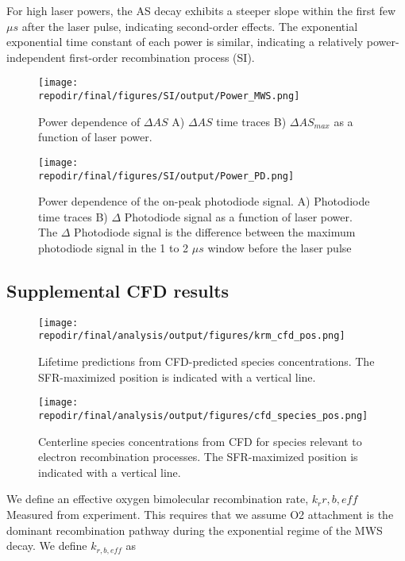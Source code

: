For high laser powers, the AS decay exhibits a steeper slope within the first few $\mu s$ after the laser pulse, indicating second-order effects. The exponential exponential time constant of each power is similar, indicating a relatively power-independent first-order recombination process (SI).

\begin{figure}[h]
    \texttt{[image: \\repodir/final/figures/SI/output/Power\_MWS.png]} 
    \caption{Power dependence of $\Delta AS$ A) $\Delta AS$ time traces B) $\Delta AS_{max}$ as a function of laser power. }
    \label{fig:SI_power_dependence_AS}
\end{figure}



\begin{figure}[h]
    \texttt{[image: \\repodir/final/figures/SI/output/Power\_PD.png]} 
    \caption{Power dependence of the on-peak photodiode signal. A) Photodiode time traces B) $\Delta$ Photodiode signal as a function of laser power. The $\Delta$ Photodiode signal is the difference between the maximum photodiode signal in the 1 to 2 $\mu s$ window before the laser pulse}
    \label{fig:SI_power_dependence_PD}
\end{figure}

\clearpage

\subsection{Supplemental CFD results}


\begin{figure}[h]
    \texttt{[image: \\repodir/final/analysis/output/figures/krm\_cfd\_pos.png]} 
    \caption{Lifetime predictions from CFD-predicted species concentrations. The SFR-maximized position is indicated with a vertical line.}
    \label{fig:SI_krm_cfd_pos}
\end{figure}


\begin{figure}[h]
    \texttt{[image: \\repodir/final/analysis/output/figures/cfd\_species\_pos.png]} 
    \caption{Centerline species concentrations from CFD for species relevant to electron recombination processes. The SFR-maximized position is indicated with a vertical line.}
    \label{fig:SI_cfd_species_pos}
\end{figure}


\clearpage

We define an effective oxygen bimolecular recombination rate, $k_r{r, b,eff}$ Measured from experiment. This requires that we assume O2 attachment is the dominant recombination pathway during the exponential regime of the MWS decay. We define $k_{r,b,eff}$ as 


